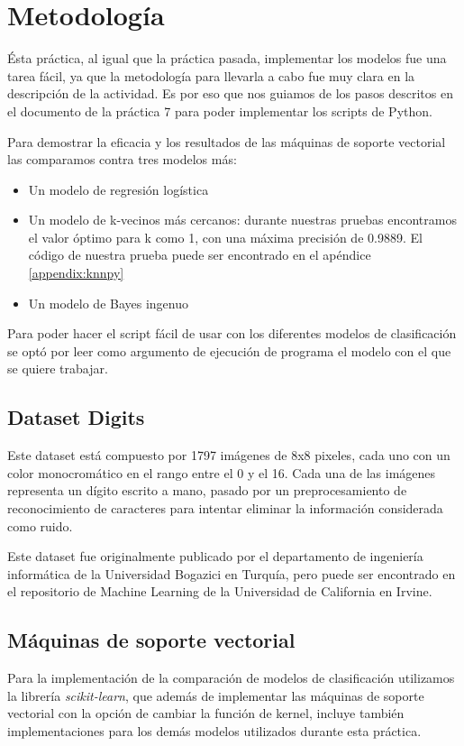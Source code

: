 \documentclass[sigconf,authorversion,nonacm]{acmart}
\begin{document}
\section{Metodología}
Ésta práctica, al igual que la práctica pasada, implementar los modelos fue una tarea fácil, ya que la metodología para llevarla a cabo fue muy clara en la descripción de la actividad. Es por eso que nos guiamos de los pasos descritos en el documento de la práctica 7 para poder implementar los scripts de Python.

Para demostrar la eficacia y los resultados de las máquinas de soporte vectorial las comparamos contra tres modelos más:
\begin{itemize}
  \item Un modelo de regresión logística
  \item Un modelo de k-vecinos más cercanos: durante nuestras pruebas encontramos el valor óptimo para k como 1, con una máxima precisión de 0.9889. El código de nuestra prueba puede ser encontrado en el apéndice \ref{appendix:knnpy}
  \item Un modelo de Bayes ingenuo
\end{itemize}

Para poder hacer el script fácil de usar con los diferentes modelos de clasificación se optó por leer como argumento de ejecución de programa el modelo con el que se quiere trabajar.


\subsection{Dataset Digits}
Este dataset está compuesto por 1797 imágenes de 8x8 pixeles, cada uno con un color monocromático en el rango entre el 0 y el 16. Cada una de las imágenes representa un dígito escrito a mano, pasado por un preprocesamiento de reconocimiento de caracteres para intentar eliminar la información considerada como ruido.

Este dataset fue originalmente publicado por el departamento de ingeniería informática de la Universidad Bogazici en Turquía\cite{Dua:2019}, pero puede ser encontrado en el repositorio de Machine Learning de la Universidad de California en Irvine.


\subsection{Máquinas de soporte vectorial}
Para la implementación de la comparación de modelos de clasificación utilizamos la librería \textit{scikit-learn}, que además de implementar las máquinas de soporte vectorial con la opción de cambiar la función de kernel, incluye también implementaciones para los demás modelos utilizados durante esta práctica.
\end{document}
